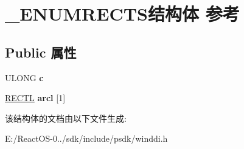 \hypertarget{struct___e_n_u_m_r_e_c_t_s}{}\section{\+\_\+\+E\+N\+U\+M\+R\+E\+C\+T\+S结构体 参考}
\label{struct___e_n_u_m_r_e_c_t_s}
\subsection*{Public 属性}
\begin{DoxyCompactItemize}
\item 
\mbox{\label{struct___e_n_u_m_r_e_c_t_s_a7e644ab838052f061c2a4a7a9372feca}} 
U\+L\+O\+NG {\bfseries c}
\item 
\mbox{\label{struct___e_n_u_m_r_e_c_t_s_a5a902ad6dd8fa82fda9789bc330046dc}} 
\hyperlink{struct___r_e_c_t_l}{R\+E\+C\+TL} {\bfseries arcl} \mbox{[}1\mbox{]}
\end{DoxyCompactItemize}


该结构体的文档由以下文件生成\+:\begin{DoxyCompactItemize}
\item 
E\+:/\+React\+O\+S-\/0../sdk/include/psdk/winddi.\+h\end{DoxyCompactItemize}
